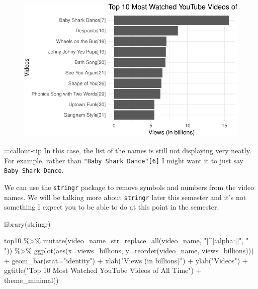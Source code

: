 \documentclass[
  letterpaper,
  DIV=11,
  numbers=noendperiod]{scrartcl}
\newenvironment{Shaded}{\begin{snugshade}}{\end{snugshade}}
\newcommand{\AttributeTok}[1]{\textcolor[rgb]{0.40,0.45,0.13}{#1}}
\newcommand{\FunctionTok}[1]{\textcolor[rgb]{0.28,0.35,0.67}{#1}}
\newcommand{\NormalTok}[1]{\textcolor[rgb]{0.00,0.23,0.31}{#1}}
\newcommand{\SpecialCharTok}[1]{\textcolor[rgb]{0.37,0.37,0.37}{#1}}
\newcommand{\StringTok}[1]{\textcolor[rgb]{0.13,0.47,0.30}{#1}}
\begin{document}
\begin{figure}[H]

{\centering \includegraphics{118_O_webscraping_tables_files/figure-pdf/unnamed-chunk-9-1.pdf}

}

\end{figure}

:::callout-tip In this case, the list of the names is still not
displaying very neatly. For example, rather than
\texttt{"Baby\ Shark\ Dance"{[}6{]}} I might want it to just say
\texttt{Baby\ Shark\ Dance}.

We can use the \texttt{stringr} package to remove symbols and numbers
from the video names. We will be talking more about \texttt{stringr}
later this semester and it's not something I expect you to be able to do
at this point in the semester.

\begin{Shaded}
\begin{Highlighting}[]
\FunctionTok{library}\NormalTok{(stringr)}

\NormalTok{top10 }\SpecialCharTok{\%\textgreater{}\%} 
  \FunctionTok{mutate}\NormalTok{(}\AttributeTok{video\_name=}\FunctionTok{str\_replace\_all}\NormalTok{(video\_name, }\StringTok{"[\^{}[:alpha:]]"}\NormalTok{, }\StringTok{" "}\NormalTok{)) }\SpecialCharTok{\%\textgreater{}\%} 
  \FunctionTok{ggplot}\NormalTok{(}\FunctionTok{aes}\NormalTok{(}\AttributeTok{x=}\NormalTok{views\_billions, }\AttributeTok{y=}\FunctionTok{reorder}\NormalTok{(video\_name, views\_billions))) }\SpecialCharTok{+}
    \FunctionTok{geom\_bar}\NormalTok{(}\AttributeTok{stat=}\StringTok{"identity"}\NormalTok{) }\SpecialCharTok{+}
    \FunctionTok{xlab}\NormalTok{(}\StringTok{"Views (in billions)"}\NormalTok{) }\SpecialCharTok{+}
    \FunctionTok{ylab}\NormalTok{(}\StringTok{"Videos"}\NormalTok{) }\SpecialCharTok{+}
    \FunctionTok{ggtitle}\NormalTok{(}\StringTok{"Top 10 Most Watched YouTube Videos of All Time"}\NormalTok{) }\SpecialCharTok{+}
    \FunctionTok{theme\_minimal}\NormalTok{()}
\end{Highlighting}
\end{Shaded}
\end{document}
